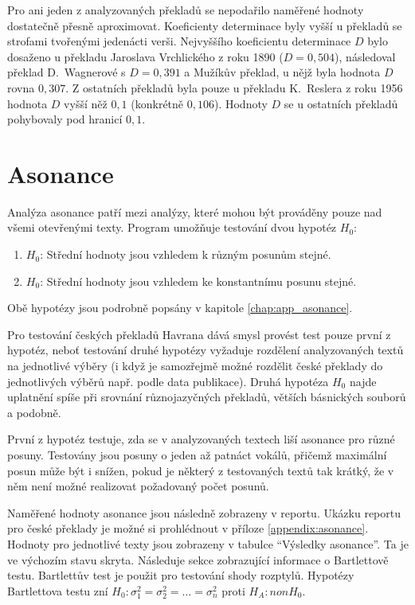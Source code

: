 \documentclass[dp.tex]{subfiles}
\begin{document}
Pro ani jeden z analyzovaných překladů se nepodařilo naměřené hodnoty dostatečně přesně aproximovat. Koeficienty determinace byly vyšší u překladů se strofami tvořenými jedenácti verši. Nejvyššího koeficientu determinace $D$ bylo dosaženo u překladu Jaroslava Vrchlického z roku 1890 ($D = 0{,}504$), následoval překlad D.~Wagnerové s $D = 0{,}391$ a Mužíkův překlad, u nějž byla hodnota $D$ rovna $0{,}307$. Z ostatních překladů byla pouze u překladu K.~Reslera z roku 1956 hodnota $D$ vyšší něž $0{,}1$ (konkrétně $0{,}106$). Hodnoty $D$ se u ostatních překladů pohybovaly pod hranicí $0{,}1$.

\section{Asonance}

Analýza asonance patří mezi analýzy, které mohou být prováděny pouze nad všemi otevřenými texty. Program umožňuje testování dvou hypotéz $H_0$:
\begin{enumerate}
\item $H_0$: Střední hodnoty jsou vzhledem k různým posunům stejné.
\item $H_0$: Střední hodnoty jsou vzhledem ke konstantnímu posunu stejné.
\end{enumerate}
Obě hypotézy jsou podrobně popsány v kapitole \ref{chap:app_asonance}.

Pro testování českých překladů Havrana dává smysl provést test pouze první z hypotéz, neboť testování druhé hypotézy vyžaduje rozdělení analyzovaných textů na jednotlivé výběry (i když je samozřejmě možné rozdělit české překlady do jednotlivých výběrů např. podle data publikace). Druhá hypotéza $H_0$ najde uplatnění spíše při srovnání různojazyčných překladů, větších básnických souborů a podobně.

První z hypotéz testuje, zda se v analyzovaných textech liší asonance pro různé posuny. Testovány jsou posuny o jeden až patnáct vokálů, přičemž maximální posun může být i snížen, pokud je některý z testovaných textů tak krátký, že v něm není možné realizovat požadovaný počet posunů.

Naměřené hodnoty asonance jsou následně zobrazeny v reportu. Ukázku reportu pro české překlady je možné si prohlédnout v příloze \ref{appendix:asonance}. Hodnoty pro jednotlivé texty jsou zobrazeny v tabulce \enquote{Výsledky asonance}. Ta je ve výchozím stavu skryta. Následuje sekce zobrazující informace o Bartlettově testu. Bartlettův test je použit pro testování shody rozptylů. Hypotézy Bartlettova testu zní $H_0: \sigma^2_1 = \sigma^2_2 = \dots = \sigma^2_n$ proti $H_A: non H_0$.
\end{document}
